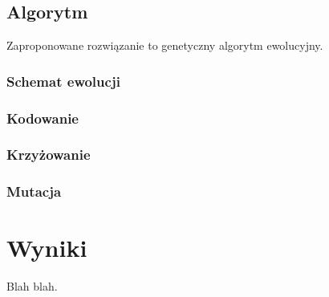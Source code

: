 \documentclass[a4paper]{article}
\begin{document}
\subsection{Algorytm}
Zaproponowane rozwiązanie to genetyczny algorytm ewolucyjny.

\subsubsection{Schemat ewolucji}

\subsubsection{Kodowanie}

\subsubsection{Krzyżowanie}

\subsubsection{Mutacja}

\newpage




\section{Wyniki}
Blah blah.

\newpage



\nocite{bib-transit-oriented}


\newpage

\listoffigures
\newpage
\end{document}
